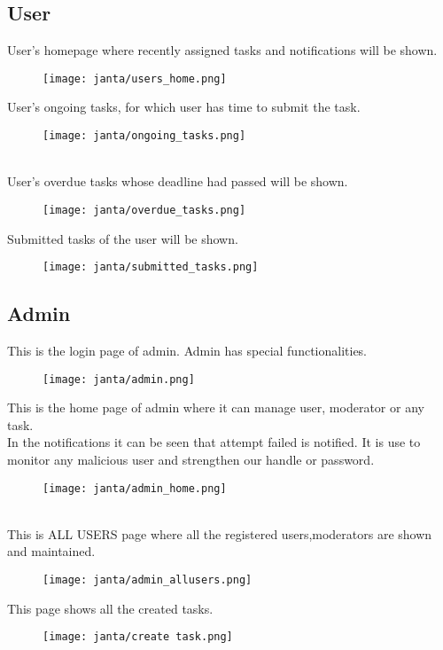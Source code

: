 \documentclass{article}
\begin{document}
\subsection{User}
User's homepage where recently assigned tasks and notifications will be shown.
\begin{figure}[htp]
    \texttt{[image: janta/users\_home.png]}
\end{figure}
\newpage
User's ongoing tasks, for which user has time to submit the task.
\begin{figure}[htp]
    \texttt{[image: janta/ongoing\_tasks.png]}
\end{figure}
\\
User's overdue tasks whose deadline had passed will be shown.
\begin{figure}[htp]
    \texttt{[image: janta/overdue\_tasks.png]}
\end{figure}
\newpage
Submitted tasks of the user will be shown.
\begin{figure}[htp]
    \texttt{[image: janta/submitted\_tasks.png]}
\end{figure}

\subsection{Admin}
This is the login page of admin. Admin has special functionalities.
\begin{figure}[htp]
    \texttt{[image: janta/admin.png]}
\end{figure}
\newpage
This is the home page of admin where it can manage user, moderator or any task.\\
In the notifications it can be seen that attempt failed is notified. It is use to monitor any malicious user and strengthen our handle or password.
\begin{figure}[htp]
    \texttt{[image: janta/admin\_home.png]}
\end{figure}
\\
This is ALL USERS page where all the registered users,moderators are shown and maintained.
\begin{figure}[htp]
    \texttt{[image: janta/admin\_allusers.png]}
\end{figure}
\newpage
This page shows all the created tasks.
\begin{figure}[htp]
    \texttt{[image: janta/create task.png]}
\end{figure}
\newpage
\end{document}
